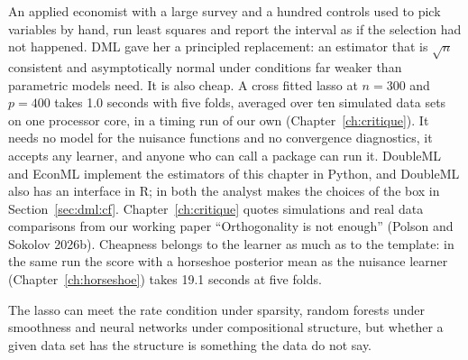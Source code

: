 An applied economist with a large survey and a hundred controls used to pick variables by hand, run least squares and report the interval as if the selection had not happened. DML gave her a principled replacement: an estimator that is $\sqrt{n}$ consistent and asymptotically normal under conditions far weaker than parametric models need. It is also cheap. A cross fitted lasso at $n = 300$ and $p = 400$ takes 1.0 seconds with five folds, averaged over ten simulated data sets on one processor core, in a timing run of our own (Chapter~\ref{ch:critique}). It needs no model for the nuisance functions and no convergence diagnostics, it accepts any learner, and anyone who can call a package can run it. DoubleML and EconML implement the estimators of this chapter in Python, and DoubleML also has an interface in R; in both the analyst makes the choices of the box in Section~\ref{sec:dml:cf}. Chapter~\ref{ch:critique} quotes simulations and real data comparisons from our working paper ``Orthogonality is not enough'' (Polson and Sokolov 2026b). Cheapness belongs to the learner as much as to the template: in the same run the score with a horseshoe posterior mean as the nuisance learner (Chapter~\ref{ch:horseshoe}) takes 19.1 seconds at five folds.

The lasso can meet the rate condition under sparsity, random forests under smoothness and neural networks under compositional structure, but whether a given data set has the structure is something the data do not say.

